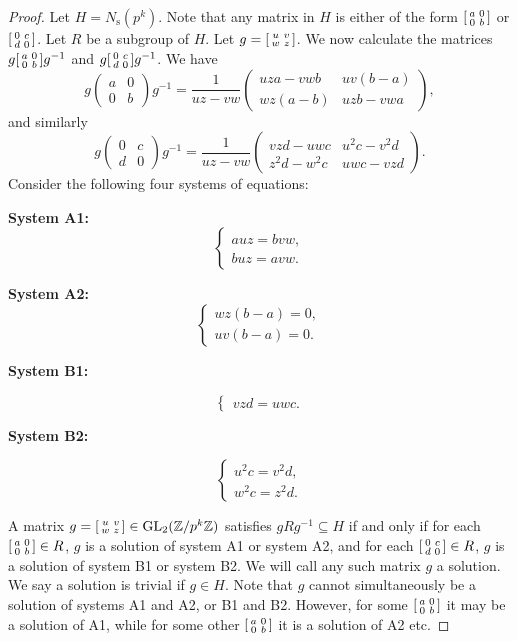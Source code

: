 \documentclass[10pt,leqno]{amsart}
\newcommand\sm[1]{\begin{bsmallmatrix}#1\end{bsmallmatrix}}
\newcommand{\Z}{\mathbb{Z}}
\newcommand{\GL}{\textnormal{GL}}
\theoremstyle{definition}
\theoremstyle{remark}
\numberwithin{theorem}{section}
\begin{document}
\begin{proof}
    Let $H=N_{\mathrm s}(p^k)$. Note that any matrix in $H$ is either of the form $\sm{a & 0 \\ 0 & b}$ or $\sm{0 & c \\ d & 0}$.  Let $R$ be a subgroup of $H$.
    Let $g=\sm{u & v \\ w & z}$. We now calculate the matrices $g \sm{a & 0 \\0 & b}g^{-1}$ and $g \sm{0 & c \\d & 0}g^{-1}$. We have $$
g
\begin{pmatrix} a & 0 \\[4pt] 0 & b \end{pmatrix}
g^{-1}
  = \frac{1}{uz - vw}
    \begin{pmatrix}
      u z a - v w b & u v (b - a) \\[4pt]
      w z (a - b) & u z b - v w a
    \end{pmatrix},
$$
and similarly
$$
g
\begin{pmatrix} 0 & c \\[4pt] d & 0 \end{pmatrix}
g^{-1}
  = \frac{1}{uz - vw}
    \begin{pmatrix}
      v z d - u w c & u^2 c - v^2 d \\[4pt]
      z^2 d - w^2 c & u w c - v z d
    \end{pmatrix}.
$$
Consider the following four systems of equations:

\textbf{System A1:}
\[
\begin{cases}
auz = bvw, \\[4pt]
buz = avw.
\end{cases}
\]

\textbf{System A2:}
\[
\begin{cases}
wz(b-a)=0, \\[4pt]
uv(b-a)=0.
\end{cases}
\]

\textbf{System B1:}

\[
\begin{cases}
vzd=uwc.
\end{cases}
\]

\textbf{System B2:}

\[
\begin{cases}
u^2c=v^2d, \\[4pt]
w^2c =z^2d.
\end{cases}
\]

A matrix $g=\sm{u & v \\ w & z}\in \GL_2(\Z/p^k\Z)$ satisfies $gRg^{-1}\subseteq H$ if and only if for each $\sm{a & 0 \\ 0 & b}\in R$, $g$ is a solution of system A1 or system A2, and for each $\sm{0 & c \\ d & 0} \in R$, $g$ is a solution of system B1 or system B2. We will call any such matrix $g$ a solution. We say a solution is trivial if $g \in H$. Note that $g$ cannot simultaneously be a solution of systems A1 and A2, or B1 and B2. However, for some $\sm{a & 0 \\ 0 & b}$ it may be a solution of A1, while for some other $\sm{a & 0 \\ 0 & b}$ it is a solution of A2 etc.


\end{proof}
\end{document}
